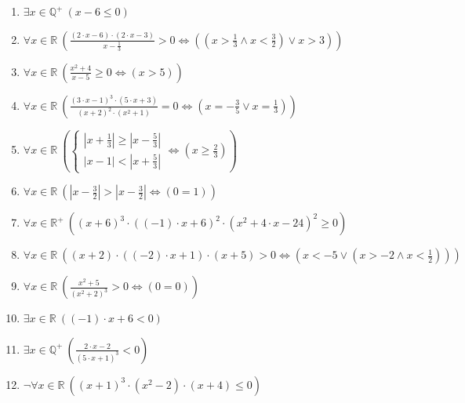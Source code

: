 \documentclass[11pt,a4paper]{article}
\begin{document}
\begin{enumerate}
\item $\displaystyle \exists x \in \mathbb{Q}^{+}\ \left( x - 6 \le 0 \right)$
\item $\displaystyle \forall x \in \mathbb{R}\ \left( \frac{\left(2 \cdot x - 6\right) \cdot \left(2 \cdot x - 3\right)}{x - \frac{1}{3}} > 0 \iff \left( \left(x > \frac{1}{3} \land x < \frac{3}{2}\right) \lor x > 3 \right) \right)$
\item $\displaystyle \forall x \in \mathbb{R}\ \left( \frac{x^{2} + 4}{x - 5} \ge 0 \iff \left( x > 5 \right) \right)$
\item $\displaystyle \forall x \in \mathbb{R}\ \left( \frac{\left(3 \cdot x - 1\right)^{3} \cdot \left(5 \cdot x + 3\right)}{\left(x + 2\right)^{2} \cdot \left(x^{2} + 1\right)} = 0 \iff \left( x = -\frac{3}{5} \lor x = \frac{1}{3} \right) \right)$
\item $\displaystyle \forall x \in \mathbb{R}\ \left( \begin{cases} \left|x + \frac{1}{3}\right| \ge \left|x - \frac{5}{3}\right| \\ \left|x - 1\right| < \left|x + \frac{5}{3}\right| \end{cases} \iff \left( x \ge \frac{2}{3} \right) \right)$
\item $\displaystyle \forall x \in \mathbb{R}\ \left( \left|x - \frac{3}{2}\right| > \left|x - \frac{3}{2}\right| \iff \left( 0 = 1 \right) \right)$
\item $\displaystyle \forall x \in \mathbb{R}^{+}\ \left( \left(x + 6\right)^{3} \cdot \left(\left(-1\right) \cdot x + 6\right)^{2} \cdot \left(x^{2} + 4 \cdot x - 24\right)^{2} \ge 0 \right)$
\item $\displaystyle \forall x \in \mathbb{R}\ \left( \left(x + 2\right) \cdot \left(\left(-2\right) \cdot x + 1\right) \cdot \left(x + 5\right) > 0 \iff \left( x < -5 \lor \left(x > -2 \land x < \frac{1}{2}\right) \right) \right)$
\item $\displaystyle \forall x \in \mathbb{R}\ \left( \frac{x^{2} + 5}{\left(x^{2} + 2\right)^{3}} > 0 \iff \left( 0 = 0 \right) \right)$
\item $\displaystyle \exists x \in \mathbb{R}\ \left( \left(-1\right) \cdot x + 6 < 0 \right)$
\item $\displaystyle \exists x \in \mathbb{Q}^{+}\ \left( \frac{2 \cdot x - 2}{\left(5 \cdot x + 1\right)^{3}} < 0 \right)$
\item $\displaystyle \lnot \forall x \in \mathbb{R}\ \left( \left(x + 1\right)^{3} \cdot \left(x^{2} - 2\right) \cdot \left(x + 4\right) \le 0 \right)$

\end{enumerate}
\end{document}
